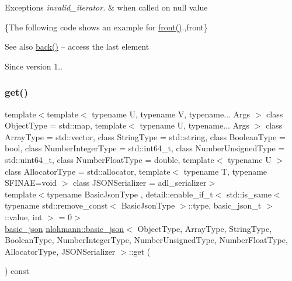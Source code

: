 \begin{DoxyExceptions}{Exceptions}
{\em invalid\+\_\+iterator.} & when called on {\ttfamily null} value\\
\hline
\end{DoxyExceptions}
\{The following code shows an example for {\ttfamily \mbox{\hyperlink{classnlohmann_1_1basic__json_a3acba9c6ceb7214e565fe08c3ba5b352}{front()}}}.,front\}

\begin{DoxySeeAlso}{See also}
\mbox{\hyperlink{classnlohmann_1_1basic__json_a011397134847f36db0ed7d7a93753677}{back()}} -- access the last element
\end{DoxySeeAlso}
\begin{DoxySince}{Since}
version 1.. 
\end{DoxySince}
\mbox{\label{classnlohmann_1_1basic__json_a6b187a22994c12c8cae0dd5ee99dc85e}} 
\subsubsection{\texorpdfstring{get()}{get()}\hspace{0.1cm}{\footnotesize\ttfamily [1/5]}}
{\footnotesize\ttfamily template$<$template$<$ typename U, typename V, typename... Args $>$ class Object\+Type = std\+::map, template$<$ typename U, typename... Args $>$ class Array\+Type = std\+::vector, class String\+Type  = std\+::string, class Boolean\+Type  = bool, class Number\+Integer\+Type  = std\+::int64\+\_\+t, class Number\+Unsigned\+Type  = std\+::uint64\+\_\+t, class Number\+Float\+Type  = double, template$<$ typename U $>$ class Allocator\+Type = std\+::allocator, template$<$ typename T, typename S\+F\+I\+N\+A\+E=void $>$ class J\+S\+O\+N\+Serializer = adl\+\_\+serializer$>$ \\
template$<$typename Basic\+Json\+Type , detail\+::enable\+\_\+if\+\_\+t$<$ std\+::is\+\_\+same$<$ typename std\+::remove\+\_\+const$<$ Basic\+Json\+Type $>$\+::type, basic\+\_\+json\+\_\+t $>$\+::value, int $>$  = 0$>$ \\
\mbox{\hyperlink{classnlohmann_1_1basic__json}{basic\+\_\+json}} \mbox{\hyperlink{classnlohmann_1_1basic__json}{nlohmann\+::basic\+\_\+json}}$<$ Object\+Type, Array\+Type, String\+Type, Boolean\+Type, Number\+Integer\+Type, Number\+Unsigned\+Type, Number\+Float\+Type, Allocator\+Type, J\+S\+O\+N\+Serializer $>$\+::get (\begin{DoxyParamCaption}{ }\end{DoxyParamCaption}) const\hspace{0.3cm}{\ttfamily [inline]}}



